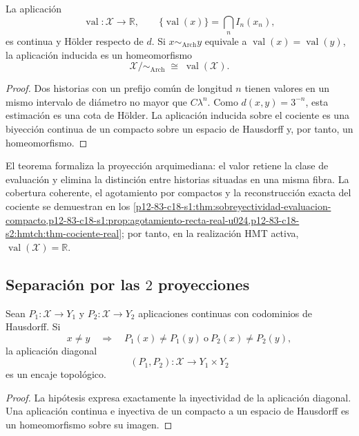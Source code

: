 \begin{theorem}
\label{p12-83-c17-s1:thm:evaluacion-holder}
\label{thm:evaluacion-holder}
La aplicación
\[
 \operatorname{val}:\mathcal X\longrightarrow\mathbb R,
 \qquad
 \{\operatorname{val}(x)\}=\bigcap_n I_n(x_n),
\]
es continua y Hölder respecto de \(d\). Si
\(x\sim_{\mathrm{Arch}}y\) equivale a
\(\operatorname{val}(x)=\operatorname{val}(y)\), la aplicación inducida
es un homeomorfismo
\[
 \mathcal X/{\sim_{\mathrm{Arch}}}
 \;\cong\;\operatorname{val}(\mathcal X).
\]
\end{theorem}

\begin{proof}
Dos historias con un prefijo común de longitud \(n\) tienen valores en un
mismo intervalo de diámetro no mayor que \(C\lambda^n\). Como
\(d(x,y)=3^{-n}\), esta estimación es una cota de Hölder. La aplicación
inducida sobre el cociente es una biyección continua de un compacto sobre
un espacio de Hausdorff y, por tanto, un homeomorfismo.
\end{proof}

El teorema formaliza la proyección arquimediana: el valor retiene la clase
de evaluación y elimina la distinción entre historias situadas en una misma
fibra. La cobertura coherente, el agotamiento por compactos y la
reconstrucción exacta del cociente se demuestran en los
\cref{p12-83-c18-s1:thm:sobreyectividad-evaluacion-compacto,p12-83-c18-s1:prop:agotamiento-recta-real-u024,p12-83-c18-s2:hmtch:thm-cociente-real};
por tanto, en la realización HMT activa,
\(\operatorname{val}(\mathcal X)=\mathbb R\).

\subsection{Separación por las \(2\) proyecciones}

\begin{theorem}
\label{p12-83-c17-s1:thm:separacion-conjunta}
\label{thm:separacion-conjunta}
Sean \(P_1:\mathcal X\to Y_1\) y \(P_2:\mathcal X\to Y_2\) aplicaciones
continuas con codominios de Hausdorff. Si
\[
 x\ne y\quad\Longrightarrow\quad
 P_1(x)\ne P_1(y)\ \text{o}\ P_2(x)\ne P_2(y),
\]
la aplicación diagonal
\[
 (P_1,P_2):\mathcal X\longrightarrow Y_1\times Y_2
\]
es un encaje topológico.
\end{theorem}

\begin{proof}
La hipótesis expresa exactamente la inyectividad de la aplicación diagonal.
Una aplicación continua e inyectiva de un compacto a un espacio de Hausdorff
es un homeomorfismo sobre su imagen.
\end{proof}

